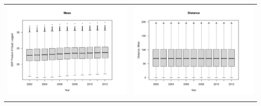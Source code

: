 \documentclass[reqno,onecolumn,letterpaper,12pt]{article}
\begin{document}
\begin{longtable}{c@{\hskip -.4cm}c}
\includegraphics[height=.2\textheight, clip=true, trim=1cm 1cm 0cm 1.6cm]{draft_figures/descriptive_plots/mass.pdf}    &
\includegraphics[height=.2\textheight, clip=true, trim=1cm 1cm 0cm 1.6cm]{draft_figures/descriptive_plots/distance.pdf}   \\

\pagebreak


\end{longtable}
\end{document}
